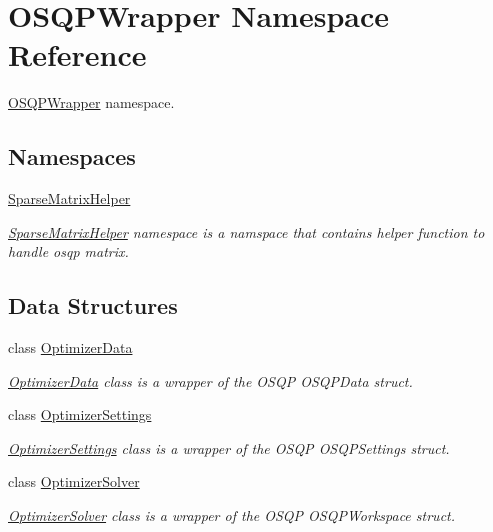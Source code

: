 \section{O\+S\+Q\+P\+Wrapper Namespace Reference}
\label{namespaceOSQPWrapper}


\hyperlink{namespaceOSQPWrapper}{O\+S\+Q\+P\+Wrapper} namespace.  


\subsection*{Namespaces}
\begin{DoxyCompactItemize}
\item 
 \hyperlink{namespaceOSQPWrapper_1_1SparseMatrixHelper}{Sparse\+Matrix\+Helper}
\begin{DoxyCompactList}\small\item\em \hyperlink{namespaceOSQPWrapper_1_1SparseMatrixHelper}{Sparse\+Matrix\+Helper} namespace is a namspace that contains helper function to handle osqp matrix. \end{DoxyCompactList}\end{DoxyCompactItemize}
\subsection*{Data Structures}
\begin{DoxyCompactItemize}
\item 
class \hyperlink{classOSQPWrapper_1_1OptimizerData}{Optimizer\+Data}
\begin{DoxyCompactList}\small\item\em \hyperlink{classOSQPWrapper_1_1OptimizerData}{Optimizer\+Data} class is a wrapper of the O\+S\+QP O\+S\+Q\+P\+Data struct. \end{DoxyCompactList}\item 
class \hyperlink{classOSQPWrapper_1_1OptimizerSettings}{Optimizer\+Settings}
\begin{DoxyCompactList}\small\item\em \hyperlink{classOSQPWrapper_1_1OptimizerSettings}{Optimizer\+Settings} class is a wrapper of the O\+S\+QP O\+S\+Q\+P\+Settings struct. \end{DoxyCompactList}\item 
class \hyperlink{classOSQPWrapper_1_1OptimizerSolver}{Optimizer\+Solver}
\begin{DoxyCompactList}\small\item\em \hyperlink{classOSQPWrapper_1_1OptimizerSolver}{Optimizer\+Solver} class is a wrapper of the O\+S\+QP O\+S\+Q\+P\+Workspace struct. \end{DoxyCompactList}\end{DoxyCompactItemize}
